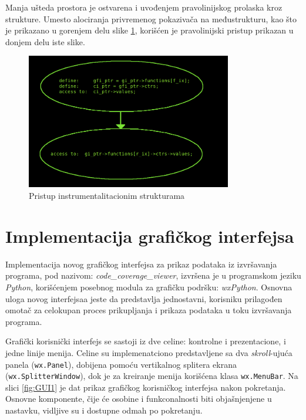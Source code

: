 \documentclass[12pt,oneside]{memoir}
\newcommand{\kod}[1]{\texttt{#1}}
\newcommand{\strano}[1]{\textit{#1}}
\begin{document}
Manja ušteda prostora je ostvarena i uvođenjem pravolinijskog prolaska kroz strukture. Umesto alociranja privremenog pokazivača na međustrukturu, kao što je prikazano u gorenjem delu slike \ref{fig:pristup}, korišćen je pravolinijski pristup prikazan u donjem delu iste slike. 
\\ 
\begin{figure}[!ht]
  \centering
  \includegraphics[width=0.8\textwidth]{img/cut_the_middleman.png}
  \caption{Pristup instrumentalitacionim strukturama}
  \label{fig:pristup}
\end{figure}


\section{Implementacija grafičkog interfejsa}

Implementacija novog grafičkog interfejsa za prikaz podataka iz izvršavanja programa, pod nazivom: \strano{code\_coverage\_viewer}, izvršena je u programskom jeziku \strano{Python}, korišćenjem posebnog modula za grafičku podršku: \strano{wxPython}. Osnovna uloga novog interfejsaa jeste da predstavlja jednostavni, korisniku prilagođen omotač za celokupan proces prikupljanja i prikaza podataka u toku izvršavanja programa. 

Grafički korisnički interfejs se sastoji iz dve celine: kontrolne i prezentacione, i jedne linije menija. Celine su implemenatciono predstavljene sa dva \strano{skroll}-ujuća panela (\kod{wx.Panel}), dobijena pomoću vertikalnog splitera ekrana (\kod{wx.SplitterWindow}), dok je za kreiranje menija korišćena klasa \kod{wx.MenuBar}. Na slici \ref{fig:GUI1} je dat prikaz grafičkog korisničkog interfejsa nakon pokretanja. Osnovne komponente, čije će osobine i funkconalnosti biti objašnjenjene u  nastavku, vidljive su i dostupne odmah po pokretanju. 
\end{document}
